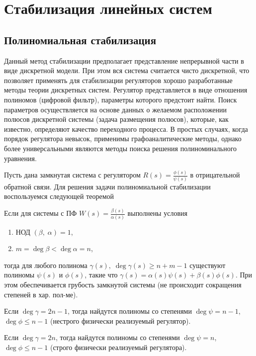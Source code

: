 \documentclass[../../TAU.tex]{subfiles}
\begin{document}
\chapter{Стабилизация линейных систем}

\section{Полиномиальная стабилизация}

    Данный метод стабилизации предполагает представление непрерывной части в виде дискретной модели. 
    При этом вся система считается чисто дискретной, что позволяет применять для стабилизации регуляторов хорошо разработанные методы теории дискретных систем. 
    Регулятор представляется в виде отношения полиномов (цифровой фильтр), параметры которого предстоит найти. 
    Поиск параметров осуществляется на основе данных о желаемом расположении полюсов дискретной системы (задача размещения полюсов), которые, как известно, определяют качество переходного процесса. 
    В простых случаях, когда порядок регулятора невысок, применимы графоаналитические методы, однако более универсальными являются методы поиска решения полиноминального уравнения.
    \cite[стр. 98]{yashin}


    Пусть дана замкнутая система с регулятором $R(s) = \frac{\phi(s)}{\psi(s)}$ в отрицательной обратной связи. 
    Для решения задачи полиномиальной стабилизации воспользуемся следующей теоремой
    \begin{theor}\label{TH1} 
        Если для системы с ПФ $W(s) = \frac{\beta(s)}{\alpha(s)}$ выполнены условия
        \begin{enumerate}
            \item НОД $(\beta,\; \alpha) = 1$,
            \item $m = \deg\beta< \deg\alpha = n$,
        \end{enumerate}
        тогда для любого полинома $\gamma(s),\; \deg\gamma(s) \ge n+m-1$ существуют полиномы $\psi(s)$ и $\phi(s)$, такие что
        $\gamma(s) = \alpha(s)\psi(s) + \beta(s)\phi(s)$. При этом обеспечивается грубость замкнутой системы (не происходит сокращения степеней в хар. пол-ме).
    \end{theor}
    \proof \cite[стр. 78-79]{pervoz}


    \begin{coroll}
        Если $\deg\gamma = 2n-1$, тогда найдутся полиномы со степенями $\deg\psi = n-1$, $\deg\phi \le n-1$ (нестрого физически реализуемый регулятор).
    \end{coroll}
    \begin{coroll}
        Если $\deg\gamma = 2n$, тогда найдутся полиномы со степенями $\deg\psi = n$, $\deg\phi \le n-1$ (строго физически реализуемый регулятора).
    \end{coroll}
\end{document}

